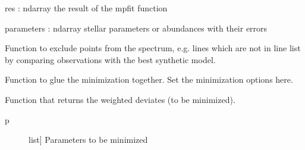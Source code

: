\documentclass[letterpaper,10pt,english]{sphinxmanual}
\begin{document}
\begin{fulllineitems}
\begin{fulllineitems}
res : ndarray
the result of the mpfit function

parameters : ndarray
stellar parameters or abundances with their errors

\end{fulllineitems}


\begin{fulllineitems}
\label{\detokenize{index:FASMA.minimization.MinimizeSynth.exclude_bad_points}}
Function to exclude points from the spectrum, e.g. lines which are not
in line list by comparing observations with the best synthetic model.

\end{fulllineitems}


\begin{fulllineitems}
\label{\detokenize{index:FASMA.minimization.MinimizeSynth.minimize}}
Function to glue the minimization together. Set the minimization options here.

\end{fulllineitems}


\begin{fulllineitems}
\label{\detokenize{index:FASMA.minimization.MinimizeSynth.minimizeElement}}
\end{fulllineitems}


\begin{fulllineitems}
\label{\detokenize{index:FASMA.minimization.MinimizeSynth.myfunct}}
Function that returns the weighted deviates (to be minimized).
\begin{description}
\item[{p}] \leavevmode{[}list{]}
Parameters to be minimized


\end{description}
\end{fulllineitems}
\end{fulllineitems}
\end{document}
